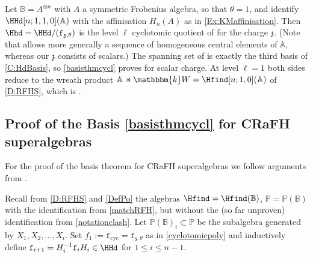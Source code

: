 \documentclass[a4paper,11pt]{amsart}
\numberwithin{equation}{subsection}
\theoremstyle{definition}
\theoremstyle{theorem}
\theoremstyle{remark}
\newcommand\charge{{\mathfrak{z}}}
\newcommand\fct{\mathtt{f}_{\charge,\theta}}
\newcommand\fcyc{\mathtt{f}_{\text{cyc}}}
\newcommand\Sym{W}
\newcommand\Po{\mathbb{P}(\mathbb{B})}
\newcommand\Poo{\mathbb{P}}
\newcommand\kk{\mathbbm{k}}
\newcommand{\Ao}{\mathbb{A}}
\newcommand{\Bo}{\mathbb{B}}
\begin{document}
\begin{Remark}\label{R:KMbasisconj}
  Let $\Bo=A^{\otimes n}$ with $A$ a symmetric Frobenius algebra, so that $\theta=1$, and identify
  $\HHd[n;1,1,0](\Ao)$ with the affinisation $H_n(A)$ as in
  \autoref{Ex:KMaffinisation}. Then $\Hhd=\HHd/(\fct)$ is the level $\ell$
  cyclotomic quotient of \cite[\S3.6]{KleshchevMuth} for the
  charge $\charge$. (Note that \cite{KleshchevMuth} allows more generally a
  sequence of homogeneous central elements of $\Ao$, whereas our $\charge$
  consists of scalars.) The spanning set of
  \cite[Proposition~3.19]{KleshchevMuth} is exactly the third basis of
  \autoref{C:HdBasis}, so \autoref{basisthmcycl} proves
  \cite[Conjecture~3.21]{KleshchevMuth} for scalar charge. At level $\ell=1$
  both sides reduce to the wreath product
  $\Ao\rtimes\kk\Sym=\Hfind[n;1,0](\Ao)$ of \autoref{D:RFHS}, which is
  \cite[Proposition~3.17]{KleshchevMuth}.
\end{Remark}

\subsection{Proof of the Basis \autoref{basisthmcycl} for CRaFH superalgebras}
For the proof of the basis theorem for CRaFH superalgebras we follow arguments from \cite{BKHeckeClifford}.

Recall from \autoref{D:RFHS} and \autoref{DefPo} the algebras $\Hfind=\Hfind(\Bo)$, $\Poo=\Po$  with the identification from \autoref{matchRFH}, but without  the (so far unproven) identification from \autoref{notationclash}.   Let $\Po_i\subset\Poo$ be the subalgebra generated by $X_1,X_2,\ldots, X_i$.  Set $f_1:=\fcyc=\fct$ as in \autoref{cyclotomicpoly} and inductively define $\mathtt{f}_{i+1}=H_{i}^{-1}\mathtt{f}_iH_i\in \HHd$ for $1\leq i\leq n-1$.
\end{document}
